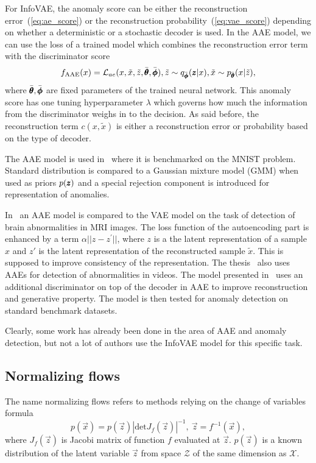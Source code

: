 For InfoVAE, the anomaly score can be either the reconstruction error~(\ref{eq:ae_score})
or the reconstruction probability~(\ref{eq:vae_score}) depending
on whether a deterministic or a stochastic decoder is used. In the
AAE model, we can use the loss of a trained model which combines the
reconstruction error term with the discriminator score 
\begin{equation}
f_{\text{AAE}}(x)=\mathcal{L}_{ae}(x,\tilde{x},\tilde{z},\bar{\pmb{{\theta}}},\bar{\pmb{{\phi}}}),\tilde{z}\sim q_{\bar{\pmb{{\phi}}}}(\pmb{{z}}|x),\tilde{x}\sim p_{\bar{\pmb{{\theta}}}}(x|\tilde{z}),\label{eq:aae_score}
\end{equation}
where $\bar{\pmb{{\theta}}},\bar{\pmb{{\phi}}}$ are fixed parameters of the trained
neural network. This anomaly score has one tuning hyperparameter $\lambda$
which governs how much the information from the discriminator weighs
in to the decision. As said before, the reconstruction term $c(x,\tilde{x})$
is either a reconstruction error or probability based on the type
of decoder.

The AAE model is used in~\cite{leveau2017adversarial} where it
is benchmarked on the MNIST problem. Standard distribution is compared
to a Gaussian mixture model (GMM) when used as priors $p(\pmb{{z}})$ and
a special rejection component is introduced for representation of
anomalies. 

In~\cite{chen2018unsupervised} an AAE model is compared to the
VAE model on the task of detection of brain abnormalities in MRI images.
The loss function of the autoencoding part is enhanced by a term $\alpha||z-z^{\prime}||$,
where $z$ is a the latent representation of a sample $x$ and $z'$
is the latent representation of the reconstructed sample $\tilde{x}$.
This is supposed to improve consistency of the representation. The
thesis~\cite{dimokranitou2017adversarial} also uses AAEs for detection
of abnormalities in videos. The model presented in~\cite{pidhorskyi2018generative}
uses an additional discriminator on top of the decoder in AAE to improve
reconstruction and generative property. The model is then tested for
anomaly detection on standard benchmark datasets.

Clearly, some work has already been done in the area of AAE and anomaly
detection, but not a lot of authors use the InfoVAE model for this
specific task.


\subsection{Normalizing flows}
The name normalizing flows refers to methods relying on the change of variables formula
\begin{equation}
    p\left(\vec{x}\right) = p\left(\vec{z}\right)\!\left\vert \text{det} J_f\!\left(\vec{z}\right) \right\vert^{-1}, ~ \vec{z} = f^{-1}\!\left(\vec{x}\right),
\label{eq:rv_transformation}
\end{equation}
where $J_f\!\left(\vec{z}\right)$ is Jacobi matrix of function $f$ evaluated at $\vec{z}$. $p(\vec{z})$ is a known distribution of the latent variable $\vec{z}$ from space $\mathcal{Z}$ of the same dimension as $\mathcal{X}$.

